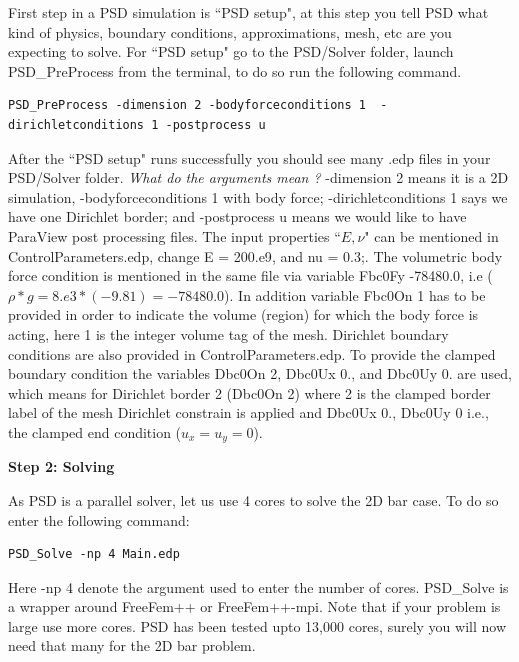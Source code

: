 First step in a PSD simulation is ``PSD setup", at this step you tell PSD what kind of physics, boundary conditions, approximations, mesh, etc are you expecting to solve.
For ``PSD setup" go to the {\ttfamily PSD/Solver} folder, launch  {\ttfamily PSD\_PreProcess} from the terminal, to do so run the following command.
\begin{lstlisting}[style=Linux]
PSD_PreProcess -dimension 2 -bodyforceconditions 1  -dirichletconditions 1 -postprocess u
\end{lstlisting}
%
After the ``PSD setup" runs successfully you should see many {\ttfamily .edp} files in your {\ttfamily PSD/Solver} folder. \textit{What do the arguments mean ?}  {\ttfamily -dimension 2} means it is a 2D simulation, {\ttfamily -bodyforceconditions 1} with body force; {\ttfamily -dirichletconditions 1} says we have one Dirichlet border; and {\ttfamily -postprocess u} means we would like to have ParaView post processing files. The input properties ``$E,\nu$" can be mentioned in {\ttfamily ControlParameters.edp}, change {\ttfamily E  = 200.e9}, and {\ttfamily nu = 0.3;}. The volumetric body force condition is mentioned in the same file via variable {\ttfamily Fbc0Fy -78480.0}, i.e ($\rho*g=8.e3*(-9.81)=-78480.0$). In addition variable {\ttfamily Fbc0On 1} has to be provided in order to indicate the volume (region) for which the body force is acting, here 1 is the integer volume tag of the mesh. Dirichlet boundary conditions are also provided in {\ttfamily ControlParameters.edp}. To provide the clamped boundary condition the variables   {\ttfamily Dbc0On 2}, {\ttfamily Dbc0Ux 0.}, and {\ttfamily Dbc0Uy 0.}  are used, which means for Dirichlet border 2 ({\ttfamily Dbc0On 2}) where 2 is the clamped border label of the mesh  Dirichlet constrain is applied and {{\ttfamily Dbc0Ux 0.}, {\ttfamily Dbc0Uy 0}} i.e., the clamped end condition ($u_x=u_y=0$).

\textbf{Step 2: Solving}

As PSD is a parallel solver, let us use  4 cores to solve the 2D bar case. To do so enter the following command:

\begin{lstlisting}[style=Linux]
PSD_Solve -np 4 Main.edp
\end{lstlisting}

Here {\ttfamily -np 4} denote the argument used to enter the number of cores. {\ttfamily PSD\_Solve} is a wrapper around {\ttfamily FreeFem++} or {\ttfamily FreeFem++-mpi}.  Note that if your problem is large use more cores. PSD has been tested upto 13,000 cores, surely you will now need that many for the 2D bar problem. 

